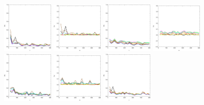 \documentclass[
twoside,
openright,
titlepage,
numbers=noenddot,
headinclude,%
footinclude=true,
dottedtoc, %
ngerman,
american, %
pagesize=pdftex,
]{book}
\begin{document}
	\begin{example}
		\begin{figure}[H]
			\centering
			\captionsetup{width=0.95\textwidth}
			\includegraphics[width=0.22\textwidth]{figures/1DTVexamples/alln1}
			\includegraphics[width=0.22\textwidth]{figures/1DTVexamples/alln2}
			\includegraphics[width=0.22\textwidth]{figures/1DTVexamples/allt1}
			\includegraphics[width=0.22\textwidth]{figures/1DTVexamples/allt2}
			\includegraphics[width=0.22\textwidth]{figures/1DTVexamples/alll1}
			\includegraphics[width=0.22\textwidth]{figures/1DTVexamples/alll2}
			\includegraphics[width=0.22\textwidth]{figures/1DTVexamples/allsn1}

\end{figure}
\end{example}
\end{document}
